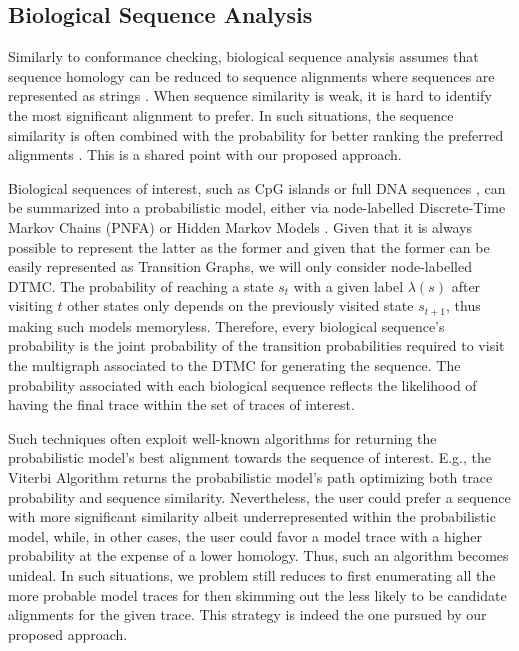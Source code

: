 

\subsection{Biological Sequence Analysis}
Similarly to conformance checking, biological sequence analysis assumes that sequence homology can be reduced to sequence alignments where sequences are represented as strings \cite{durbin1998biological}. When sequence similarity is weak, it is hard to identify the most significant alignment to prefer. In such situations, the sequence similarity is often combined with the probability for better ranking the preferred alignments \cite{durbin1998biological}. This is a shared point with our proposed approach. 

Biological sequences of interest, such as CpG islands \cite{kxq005} or full DNA sequences \cite{BISHOP1986159}, can be summarized into a probabilistic model, either via node-labelled Discrete-Time Markov Chains (PNFA) \cite{RyabkoU08} or Hidden Markov Models \cite{Helske2018}. Given that it is always possible to represent the latter as the former \cite{DUPONT20051349} and given that the former can be easily represented as Transition Graphs, we will only consider node-labelled DTMC. The probability of reaching a state $s_t$ with a given label $\lambda(s)$ after visiting $t$ other states only depends on the previously visited state $s_{t+1}$, thus making such models memoryless. Therefore, every biological sequence's probability is the joint probability of the transition probabilities required to visit the multigraph associated to the DTMC for generating the sequence. The probability associated with each biological sequence reflects the likelihood of having the final trace within the set of traces of interest. 

Such techniques often exploit well-known algorithms for returning the probabilistic model's best alignment towards the sequence of interest. E.g., the Viterbi Algorithm  returns the probabilistic model's path optimizing both trace probability and sequence similarity.  Nevertheless, the user could prefer a sequence with more significant similarity albeit underrepresented within the probabilistic model, while, in other cases, the user could favor a model trace with a higher probability at the expense of a lower homology. Thus, such an algorithm becomes unideal. In such situations, we problem still reduces to first enumerating all the more probable model traces for then skimming out the less likely to be candidate alignments for the given trace. This strategy is indeed the one pursued by our proposed approach. 
